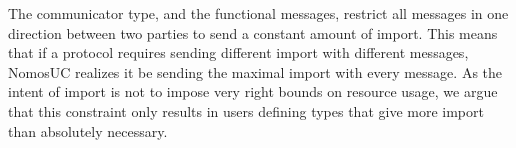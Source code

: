 The communicator type, and the functional messages, restrict all messages in one direction between two parties to send a constant amount of import.
This means that if a protocol requires sending different import with different messages, NomosUC realizes it be sending the maximal import with every message.
As the intent of import is not to impose very right bounds on resource usage, we argue that this constraint only results in users defining types that give more import than absolutely necessary.




